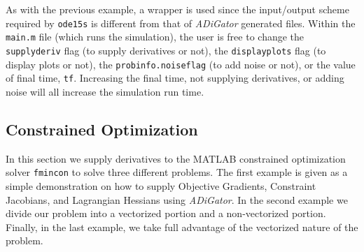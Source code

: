 \documentclass[10pt,pdftex]{article}
\begin{document}
As with the previous example, a wrapper is used since the input/output scheme required by \texttt{ode15s} is different from that of \emph{ADiGator} generated files. Within the \texttt{main.m} file (which runs the simulation), the user is free to change the \texttt{supplyderiv} flag (to supply derivatives or not), the \texttt{displayplots} flag (to display plots or not), the \texttt{probinfo.noiseflag} (to add noise or not), or the value of final time, \texttt{tf}. Increasing the final time, not supplying derivatives, or adding noise will all increase the simulation run time. 
\subsection{Constrained Optimization}
In this section we supply derivatives to the MATLAB constrained optimization solver \texttt{fmincon} to solve three different problems. The first example is given as a simple demonstration on how to supply Objective Gradients, Constraint Jacobians, and Lagrangian Hessians using \emph{ADiGator}. In the second example we divide our problem into a vectorized portion and a non-vectorized portion. Finally, in the last example, we take full advantage of the vectorized nature of the problem.
\end{document}
